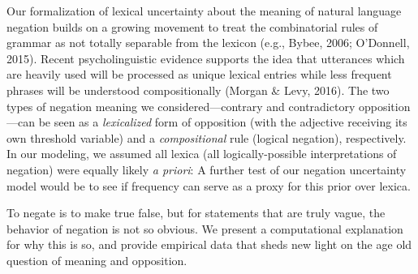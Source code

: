 \documentclass[floatsintext,doc]{apa6}
\begin{document}
Our formalization of lexical uncertainty about the meaning of natural language negation builds on a growing movement to treat the combinatorial rules of grammar as not totally separable from the lexicon (e.g., Bybee, 2006; O'Donnell, 2015).
Recent psycholinguistic evidence supports the idea that utterances which are heavily used will be processed as unique lexical entries while less frequent phrases will be understood compositionally (Morgan \& Levy, 2016).
The two types of negation meaning we considered---contrary and contradictory opposition---can be seen as a \emph{lexicalized} form of opposition (with the adjective receiving its own threshold variable) and a \emph{compositional} rule (logical negation), respectively.
In our modeling, we assumed all lexica (all logically-possible interpretations of negation) were equally likely \emph{a priori}: A further test of our negation uncertainty model would be to see if frequency can serve as a proxy for this prior over lexica.

To negate is to make true false, but for statements that are truly vague, the behavior of negation is not so obvious.
We present a computational explanation for why this is so, and provide empirical data that sheds new light on the age old question of meaning and opposition.

\newpage






\setlength{\bibleftmargin}{.125in}
\setlength{\bibindent}{-\bibleftmargin}
\end{document}
